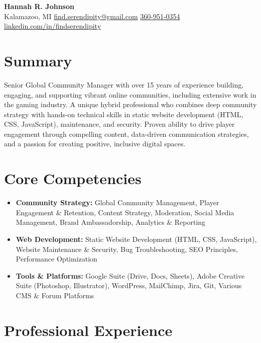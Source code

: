 \documentclass[a4paper,12pt]{article} %
\begin{document}
\begin{center}
    {\LARGE \textbf{Hannah R. Johnson}} \\
    \vspace{1mm}
    Kalamazoo, MI \textbar{} \href{mailto:find.serendipity@gmail.com}{find.serendipity@gmail.com} \textbar{} \href{tel:360-951-0354}{360-951-0354} \textbar{} \href{https://www.linkedin.com/in/findserendipity/}{linkedin.com/in/findserendipity}
\end{center}

\section{Summary}
Senior Global Community Manager with over 15 years of experience building, engaging, and supporting vibrant online communities, including extensive work in the gaming industry. A unique hybrid professional who combines deep community strategy with hands-on technical skills in static website development (HTML, CSS, JavaScript), maintenance, and security. Proven ability to drive player engagement through compelling content, data-driven communication strategies, and a passion for creating positive, inclusive digital spaces.

\section{Core Competencies}
\begin{itemize}
    \item \textbf{Community Strategy:} Global Community Management, Player Engagement \& Retention, Content Strategy, Moderation, Social Media Management, Brand Ambassadorship, Analytics \& Reporting
    \item \textbf{Web Development:} Static Website Development (HTML, CSS, JavaScript), Website Maintenance \& Security, Bug Troubleshooting, SEO Principles, Performance Optimization
    \item \textbf{Tools \& Platforms:} Google Suite (Drive, Docs, Sheets), Adobe Creative Suite (Photoshop, Illustrator), WordPress, MailChimp, Jira, Git, Various CMS \& Forum Platforms
\end{itemize}

\section{Professional Experience}
\end{document}

